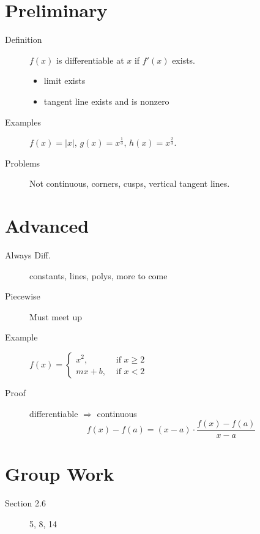 \documentclass[11pt]{article}
\newcommand{\ds}{\displaystyle}
\begin{document}
\drawtitle

\section*{Preliminary}
\begin{description}
\item[Definition] $f(x)$ is differentiable at $x$ if $f'(x)$ exists.
  \begin{itemize}
  \item limit exists
  \item tangent line exists and is nonzero
  \end{itemize}
\item[Examples] $f(x)=|x|$, $g(x)=x^{\frac{1}{3}}$,
  $h(x)=x^{\frac{2}{3}}$.
\item[Problems] Not continuous, corners, cusps, vertical tangent lines.
\end{description}

\section*{Advanced}
\begin{description}
\item[Always Diff.] constants, lines, polys, more to come
\item[Piecewise] Must meet up
\item[Example] $\ds f(x)= \left\{ \begin{array}{ll} x^2,&\mbox{ if } x\geq 2\\ mx+b,&\mbox{ if } x<2\end{array}\right.$
\item[Proof] differentiable $\Rightarrow$ continuous
  \[
  \ds f(x)-f(a)=(x-a)\cdot\frac{f(x)-f(a)}{x-a}
  \]
\end{description}

\section*{Group Work}
\begin{description}
\item[Section 2.6] 5, 8, 14
\end{description}
\end{document}
